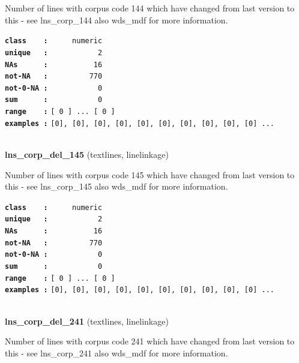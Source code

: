 \documentclass[]{article}
\begin{document}
Number of lines with corpus code 144 which have changed from last
version to this - see lns\_corp\_144 also wds\_mdf for more information.

\textbf{\texttt{class\ \ \ \ :}} \texttt{~~~~~numeric}\\
\textbf{\texttt{unique\ \ \ :}} \texttt{~~~~~~~~~~~2}\\
\textbf{\texttt{NAs\ \ \ \ \ \ :}} \texttt{~~~~~~~~~~16}\\
\textbf{\texttt{not-NA\ \ \ :}} \texttt{~~~~~~~~~770}\\
\textbf{\texttt{not-0-NA\ :}} \texttt{~~~~~~~~~~~0}\\
\textbf{\texttt{sum\ \ \ \ \ \ :}} \texttt{~~~~~~~~~~~0}\\
\textbf{\texttt{range\ \ \ \ :}}
\texttt{{[}\ 0\ {]}\ ...\ {[}\ 0\ {]}}\\
\textbf{\texttt{examples\ :}}
\texttt{{[}0{]},\ {[}0{]},\ {[}0{]},\ {[}0{]},\ {[}0{]},\ {[}0{]},\ {[}0{]},\ {[}0{]},\ {[}0{]},\ {[}0{]}\ ...}\\

~

\textbf{lns\_corp\_del\_145} (textlines, linelinkage)

Number of lines with corpus code 145 which have changed from last
version to this - see lns\_corp\_145 also wds\_mdf for more information.

\textbf{\texttt{class\ \ \ \ :}} \texttt{~~~~~numeric}\\
\textbf{\texttt{unique\ \ \ :}} \texttt{~~~~~~~~~~~2}\\
\textbf{\texttt{NAs\ \ \ \ \ \ :}} \texttt{~~~~~~~~~~16}\\
\textbf{\texttt{not-NA\ \ \ :}} \texttt{~~~~~~~~~770}\\
\textbf{\texttt{not-0-NA\ :}} \texttt{~~~~~~~~~~~0}\\
\textbf{\texttt{sum\ \ \ \ \ \ :}} \texttt{~~~~~~~~~~~0}\\
\textbf{\texttt{range\ \ \ \ :}}
\texttt{{[}\ 0\ {]}\ ...\ {[}\ 0\ {]}}\\
\textbf{\texttt{examples\ :}}
\texttt{{[}0{]},\ {[}0{]},\ {[}0{]},\ {[}0{]},\ {[}0{]},\ {[}0{]},\ {[}0{]},\ {[}0{]},\ {[}0{]},\ {[}0{]}\ ...}\\

~

\textbf{lns\_corp\_del\_241} (textlines, linelinkage)

Number of lines with corpus code 241 which have changed from last
version to this - see lns\_corp\_241 also wds\_mdf for more information.
\end{document}
